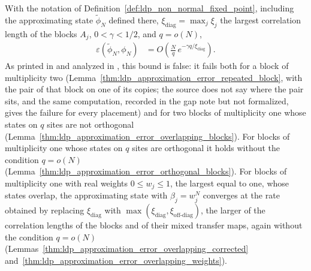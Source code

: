 \begin{lemma}
    \label{thm:ldp_approximation_error_general}
    \notready
    With the notation of Definition~\ref{def:ldp_non_normal_fixed_point},
    including the approximating state $\widetilde\phi_N$ defined there,
    $\xi_{\mathrm{diag}}=\max_j\xi_j$ the largest correlation length of the
    blocks $A_j$, $0<\gamma<1/2$, and $q=o(N)$,
    \begin{align}
        \varepsilon(\widetilde\phi_N,\phi_N)
         & =O\!\left(\frac Nq\,e^{-\gamma q/\xi_{\mathrm{diag}}}\right).
        \label{eq:ldp_approximation_error_general}
    \end{align}
    As printed in \cite[Lemma~1$'$(ii)]{Malz2024Preparation} and analyzed in
    \cite{gap:mswc24_multiplicity_fixed_point,gap:mswc24_block_form_mixed_overlap},
    this bound is false: it fails both for a block of multiplicity two
    (Lemma~\ref{thm:ldp_approximation_error_repeated_block}, with the pair of
    that block on one of its copies; the source does not say where the pair
    sits, and the same computation, recorded in the gap note but not
    formalized, gives the failure for every placement) and for two
    blocks of multiplicity one whose states on $q$ sites are not orthogonal
    (Lemma~\ref{thm:ldp_approximation_error_overlapping_blocks}).
    For blocks of multiplicity one whose states on $q$ sites are orthogonal it
    holds without the condition $q=o(N)$
    (Lemma~\ref{thm:ldp_approximation_error_orthogonal_blocks}). For blocks of
    multiplicity one with real weights $0\leq w_j\leq1$, the largest equal to one,
    whose states overlap, the approximating state with $\beta_j=w_j^N$
    converges at the rate obtained by replacing $\xi_{\mathrm{diag}}$ with
    $\max(\xi_{\mathrm{diag}},\xi_{\mathrm{off\text{-}diag}})$, the larger of the
    correlation lengths of the blocks and of their mixed transfer maps, again
    without the condition $q=o(N)$
    (Lemmas~\ref{thm:ldp_approximation_error_overlapping_corrected}
    and~\ref{thm:ldp_approximation_error_overlapping_weights}).
\end{lemma}

